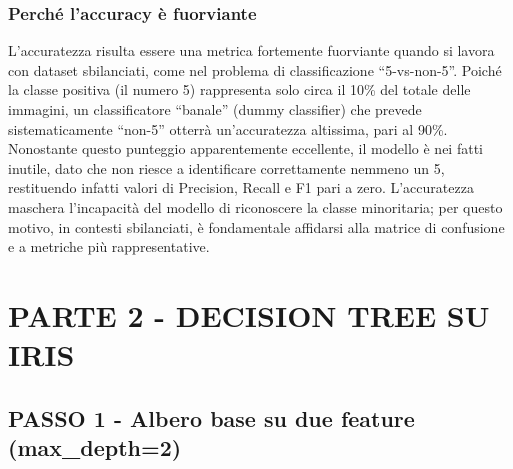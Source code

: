 \documentclass[11pt]{article}
\begin{document}
    \hypertarget{perchuxe9-laccuracy-uxe8-fuorviante}{%
\subsubsection{Perché l'accuracy è
fuorviante}\label{perchuxe9-laccuracy-uxe8-fuorviante}}

L'accuratezza risulta essere una metrica fortemente fuorviante quando si
lavora con dataset sbilanciati, come nel problema di classificazione
``5-vs-non-5''. Poiché la classe positiva (il numero 5) rappresenta solo
circa il 10\% del totale delle immagini, un classificatore ``banale''
(dummy classifier) che prevede sistematicamente ``non-5'' otterrà
un'accuratezza altissima, pari al 90\%. Nonostante questo punteggio
apparentemente eccellente, il modello è nei fatti inutile, dato che non
riesce a identificare correttamente nemmeno un 5, restituendo infatti
valori di Precision, Recall e F1 pari a zero. L'accuratezza maschera
l'incapacità del modello di riconoscere la classe minoritaria; per
questo motivo, in contesti sbilanciati, è fondamentale affidarsi alla
matrice di confusione e a metriche più rappresentative.

    \hypertarget{parte-2---decision-tree-su-iris}{%
\section{PARTE 2 - DECISION TREE SU
IRIS}\label{parte-2---decision-tree-su-iris}}

\hypertarget{passo-1---albero-base-su-due-feature-max_depth2}{%
\subsection{PASSO 1 - Albero base su due feature
(max\_depth=2)}\label{passo-1---albero-base-su-due-feature-max_depth2}}
\end{document}
